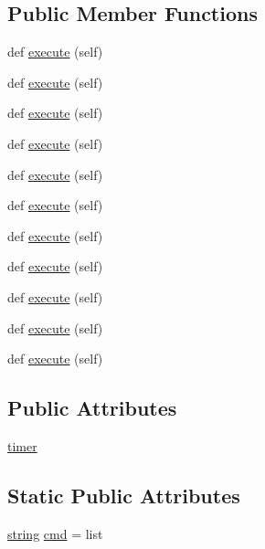 \subsection*{Public Member Functions}
\begin{DoxyCompactItemize}
\item 
def \hyperlink{classwaflib_1_1_build_1_1_list_context_a43e5734b6ac586e4926103d394a17820}{execute} (self)
\item 
def \hyperlink{classwaflib_1_1_build_1_1_list_context_a43e5734b6ac586e4926103d394a17820}{execute} (self)
\item 
def \hyperlink{classwaflib_1_1_build_1_1_list_context_a43e5734b6ac586e4926103d394a17820}{execute} (self)
\item 
def \hyperlink{classwaflib_1_1_build_1_1_list_context_a43e5734b6ac586e4926103d394a17820}{execute} (self)
\item 
def \hyperlink{classwaflib_1_1_build_1_1_list_context_a43e5734b6ac586e4926103d394a17820}{execute} (self)
\item 
def \hyperlink{classwaflib_1_1_build_1_1_list_context_a43e5734b6ac586e4926103d394a17820}{execute} (self)
\item 
def \hyperlink{classwaflib_1_1_build_1_1_list_context_a43e5734b6ac586e4926103d394a17820}{execute} (self)
\item 
def \hyperlink{classwaflib_1_1_build_1_1_list_context_a43e5734b6ac586e4926103d394a17820}{execute} (self)
\item 
def \hyperlink{classwaflib_1_1_build_1_1_list_context_a43e5734b6ac586e4926103d394a17820}{execute} (self)
\item 
def \hyperlink{classwaflib_1_1_build_1_1_list_context_a43e5734b6ac586e4926103d394a17820}{execute} (self)
\item 
def \hyperlink{classwaflib_1_1_build_1_1_list_context_a43e5734b6ac586e4926103d394a17820}{execute} (self)
\end{DoxyCompactItemize}
\subsection*{Public Attributes}
\begin{DoxyCompactItemize}
\item 
\hyperlink{classwaflib_1_1_build_1_1_list_context_a2440b62cce031e7ed00fbbfd8245ec60}{timer}
\end{DoxyCompactItemize}
\subsection*{Static Public Attributes}
\begin{DoxyCompactItemize}
\item 
\hyperlink{test__lib_f_l_a_c_2format_8c_ab02026ad0de9fb6c1b4233deb0a00c75}{string} \hyperlink{classwaflib_1_1_build_1_1_list_context_aeea59b217c7c13581ea3fb00ae7d0933}{cmd} = \textquotesingle{}list\textquotesingle{}
\end{DoxyCompactItemize}



